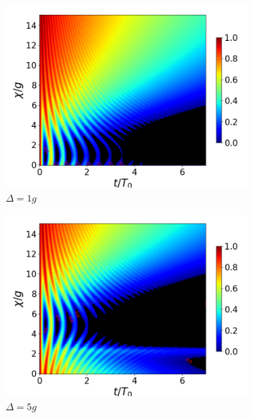 \begin{figure}[h!]
\begin{subfigure}{0.49\textwidth}
        \includegraphics[width=\textwidth]{figuras/ch4/concu/chi/eg0+ge0 d=1.0g k=0.0g J=0.0g gamma=0.25g concu chi dis.png}
        \caption{$\Delta=1g$}
        \label{fig4:concu x d1}
    \end{subfigure}
    \hfill
    \begin{subfigure}{0.49\textwidth}
        \includegraphics[width=\textwidth]{figuras/ch4/concu/chi/eg0+ge0 d=5.0g k=0.0g J=0.0g gamma=0.25g concu chi dis.png}
        \caption{$\Delta=5g$}
        \label{fig4:concu x d2}
    \end{subfigure}
    \vfill
    \begin{subfigure}{0.49\textwidth}

\end{subfigure}
\end{figure}
